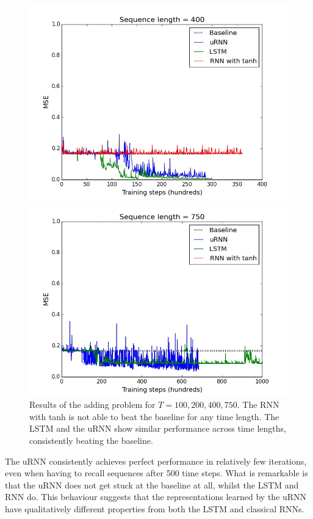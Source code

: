 \documentclass{article} %
\begin{document}
\begin{figure}[t!]
\begin{minipage}[b]{0.5\linewidth}
    \includegraphics[scale=0.25]{figures/adding_400.jpeg}
    \end{minipage}%
  \begin{minipage}[b]{0.5\linewidth}
    \centering
    \includegraphics[scale=0.25]{figures/adding_750.jpeg}
  \end{minipage} 
  \caption{Results of the adding problem for $T=100, 200, 400, 750$. The RNN with tanh
	  is not able to beat the baseline for any time length. The LSTM and the uRNN show similar 
	  performance across time lengths, consistently beating the baseline.}
  \label{fig2} 
\end{figure}

The uRNN consistently achieves perfect performance in relatively few iterations, even when having to recall
sequences after 500 time steps. What is remarkable is that the uRNN does not get stuck at the baseline at 
all, whilst the LSTM and RNN do. This behaviour suggests that the representations learned by the uRNN
have qualitatively different properties from both the LSTM and classical RNNs. 
\end{document}
